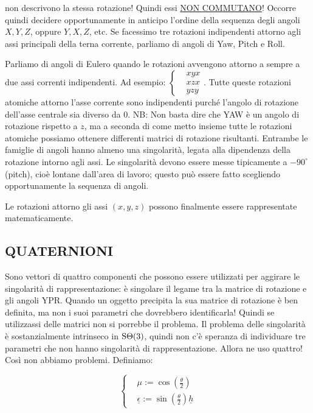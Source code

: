 non descrivono la stessa rotazione! Quindi essi \underline{NON COMMUTANO}! Occorre quindi decidere opportunamente in anticipo l'ordine della sequenza degli angoli $X,Y,Z$, oppure $Y,X,Z$, etc. Se facessimo tre rotazioni indipendenti attorno agli assi principali della terna corrente, parliamo di angoli di Yaw, Pitch e Roll.

Parliamo di angoli di Eulero quando le rotazioni avvengono attorno a sempre a due assi correnti indipendenti. Ad esempio: $\left\{\begin{aligned}&xyx\\&xzx\\&yzy\end{aligned}\right.$. Tutte queste rotazioni atomiche attorno l'asse corrente sono indipendenti purché l'angolo di rotazione dell'asse centrale sia diverso da 0. NB: Non basta dire che YAW è un angolo di rotazione rispetto a $z$, ma a seconda di come metto insieme tutte le rotazioni atomiche possiamo ottenere differenti matrici di rotazione risultanti. Entrambe le famiglie di angoli hanno almeno una singolarità, legata alla dipendenza della rotazione intorno agli assi. Le singolarità devono essere messe tipicamente a $-90^{\circ}$ (pitch), cioè lontane dall'area di lavoro; questo può essere fatto scegliendo opportunamente la sequenza di angoli.

Le rotazioni attorno gli assi $(x,y,z)$ possono finalmente essere rappresentate matematicamente.

\subsection{QUATERNIONI}

Sono vettori di quattro componenti che possono essere utilizzati per aggirare le singolarità di rappresentazione: è singolare il legame tra la matrice di rotazione e gli angoli YPR. Quando un oggetto precipita la sua matrice di rotazione è ben definita, ma non i suoi parametri che dovrebbero identificarla! Quindi se utilizzassi delle matrici non si porrebbe il problema. Il problema delle singolarità è sostanzialmente intrinseco in $\operatorname{S\Theta}(3)$, quindi non c'è speranza di individuare tre parametri che non hanno singolarità di rappresentazione. Allora ne uso quattro! Così non abbiamo problemi. Definiamo:

\[
	\left\{
	\begin{aligned}
	&\mu := \cos(\frac{\theta}{2})\\
	&\underline{\epsilon} := \sin(\frac{\theta}{2})\underline{h}
	\end{aligned}
	\right.
\]

